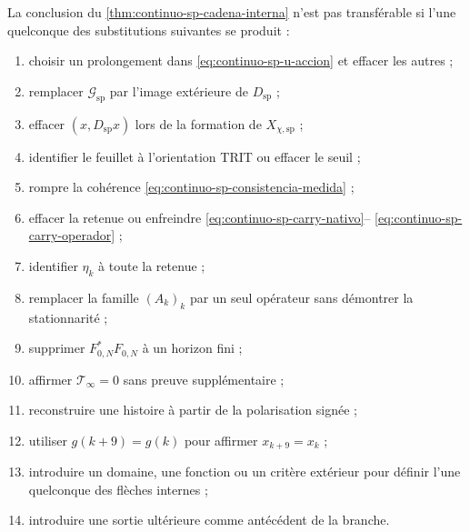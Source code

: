 \begin{proposition}
\label{prop:continuo-sp-falsadores}
La conclusion du
\cref{thm:continuo-sp-cadena-interna} n'est pas transférable si l'une quelconque
des substitutions suivantes se produit :
\begin{enumerate}
 \item choisir un prolongement dans
       \eqref{eq:continuo-sp-u-accion} et effacer les autres ;
 \item remplacer \(\mathcal G_{\mathrm{sp}}\) par l'image extérieure de
       \(D_{\mathrm{sp}}\) ;
 \item effacer \((x,D_{\mathrm{sp}}x)\) lors de la formation de
       \(X_{\chi,\mathrm{sp}}\) ;
 \item identifier le feuillet à l'orientation TRIT ou effacer le seuil ;
 \item rompre la cohérence
       \eqref{eq:continuo-sp-consistencia-medida} ;
 \item effacer la retenue ou enfreindre
       \eqref{eq:continuo-sp-carry-nativo}--
       \eqref{eq:continuo-sp-carry-operador} ;
 \item identifier \(\eta_k\) à toute la retenue ;
 \item remplacer la famille \((A_k)_k\) par un seul opérateur sans démontrer
       la stationnarité ;
 \item supprimer \(F_{0,N}^*F_{0,N}\) à un horizon fini ;
 \item affirmer \(\mathcal T_\infty=0\) sans preuve supplémentaire ;
 \item reconstruire une histoire à partir de la polarisation signée ;
 \item utiliser \(g(k+9)=g(k)\) pour affirmer \(x_{k+9}=x_k\) ;
 \item introduire un domaine, une fonction ou un critère extérieur pour
       définir l'une quelconque des flèches internes ;
 \item introduire une sortie ultérieure comme antécédent de la branche.
\end{enumerate}
\end{proposition}
\fi
